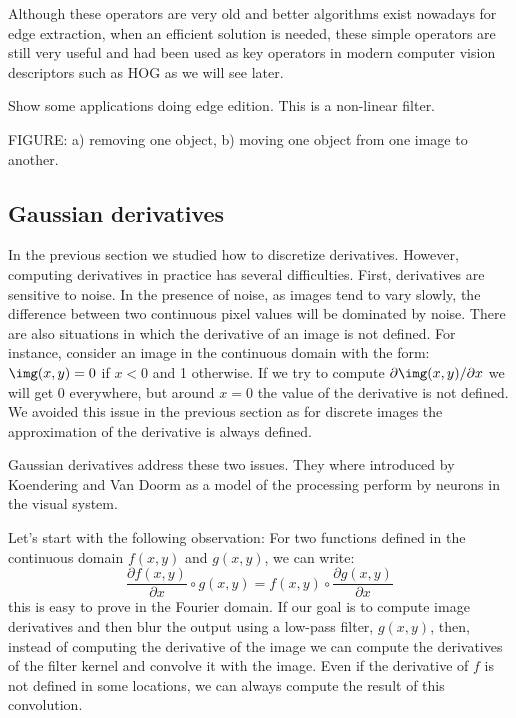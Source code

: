 Although these operators are very old and better algorithms exist nowadays for edge extraction, when an efficient solution is needed, these simple operators are still very useful and had been used as key operators in modern computer vision descriptors such as HOG as we will see later.



Show some applications doing edge edition. This is a non-linear filter.



FIGURE: a) removing one object, b) moving one object from one image to another. 

\subsection{Gaussian derivatives}

In the previous section we studied how to discretize derivatives. However, computing derivatives in practice has several difficulties. First, derivatives are sensitive to noise. In the presence of noise, as images tend to vary slowly, the difference between two continuous pixel values will be dominated by noise. There are also situations in which the derivative of an image is not defined. For instance, consider an image in the continuous domain with the form: $\img (x,y) = 0$ if $x<0$ and 1 otherwise. If we try to compute $\partial \img (x,y) / \partial x$ we will get 0 everywhere, but around $x=0$ the value of the derivative is not defined. We avoided this issue in the previous section as for discrete images the approximation of the derivative is always defined. 

Gaussian derivatives address these two issues. They where introduced by Koendering and Van Doorm \cite{} as a model of the processing perform by neurons in the visual system. 
 
Let's start with the following observation: For two functions defined in the continuous domain $f(x,y)$ and $g(x,y)$, we can write:
\begin{equation}
\frac {\partial f(x,y)}{\partial x} \circ g(x,y) = f(x,y) \circ \frac {\partial g(x,y)}{\partial x} 
\end{equation}
this is easy to prove in the Fourier domain. If our goal is to compute image derivatives and then blur the output using a low-pass filter, $g(x,y)$, then, instead of computing the derivative of the image we can compute the derivatives of the filter kernel and convolve it with the image. Even if the derivative of $f$ is not defined in some locations, we can always compute the result of this convolution. 

